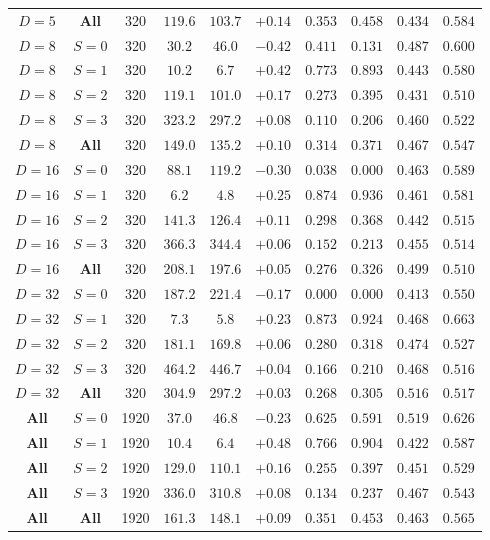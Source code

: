 \begin{table}[htbp]
\begin{tabular}{cc c ccc cc cc}
$D=5$ & \textbf{All} & 320 & $119.6$ & $103.7$ & $+0.14$ & $0.353$ & $0.458$ & $0.434$ & $0.584$ \\
$D=8$ & $S=0$ & 320 & $30.2$ & $46.0$ & $-0.42$ & $0.411$ & $0.131$ & $0.487$ & $0.600$ \\
$D=8$ & $S=1$ & 320 & $10.2$ & $6.7$ & $+0.42$ & $0.773$ & $0.893$ & $0.443$ & $0.580$ \\
$D=8$ & $S=2$ & 320 & $119.1$ & $101.0$ & $+0.17$ & $0.273$ & $0.395$ & $0.431$ & $0.510$ \\
$D=8$ & $S=3$ & 320 & $323.2$ & $297.2$ & $+0.08$ & $0.110$ & $0.206$ & $0.460$ & $0.522$ \\
$D=8$ & \textbf{All} & 320 & $149.0$ & $135.2$ & $+0.10$ & $0.314$ & $0.371$ & $0.467$ & $0.547$ \\
$D=16$ & $S=0$ & 320 & $88.1$ & $119.2$ & $-0.30$ & $0.038$ & $0.000$ & $0.463$ & $0.589$ \\
$D=16$ & $S=1$ & 320 & $6.2$ & $4.8$ & $+0.25$ & $0.874$ & $0.936$ & $0.461$ & $0.581$ \\
$D=16$ & $S=2$ & 320 & $141.3$ & $126.4$ & $+0.11$ & $0.298$ & $0.368$ & $0.442$ & $0.515$ \\
$D=16$ & $S=3$ & 320 & $366.3$ & $344.4$ & $+0.06$ & $0.152$ & $0.213$ & $0.455$ & $0.514$ \\
$D=16$ & \textbf{All} & 320 & $208.1$ & $197.6$ & $+0.05$ & $0.276$ & $0.326$ & $0.499$ & $0.510$ \\
$D=32$ & $S=0$ & 320 & $187.2$ & $221.4$ & $-0.17$ & $0.000$ & $0.000$ & $0.413$ & $0.550$ \\
$D=32$ & $S=1$ & 320 & $7.3$ & $5.8$ & $+0.23$ & $0.873$ & $0.924$ & $0.468$ & $0.663$ \\
$D=32$ & $S=2$ & 320 & $181.1$ & $169.8$ & $+0.06$ & $0.280$ & $0.318$ & $0.474$ & $0.527$ \\
$D=32$ & $S=3$ & 320 & $464.2$ & $446.7$ & $+0.04$ & $0.166$ & $0.210$ & $0.468$ & $0.516$ \\
$D=32$ & \textbf{All} & 320 & $304.9$ & $297.2$ & $+0.03$ & $0.268$ & $0.305$ & $0.516$ & $0.517$ \\
\textbf{All} & $S=0$ & 1920 & $37.0$ & $46.8$ & $-0.23$ & $0.625$ & $0.591$ & $0.519$ & $0.626$ \\
\textbf{All} & $S=1$ & 1920 & $10.4$ & $6.4$ & $+0.48$ & $0.766$ & $0.904$ & $0.422$ & $0.587$ \\
\textbf{All} & $S=2$ & 1920 & $129.0$ & $110.1$ & $+0.16$ & $0.255$ & $0.397$ & $0.451$ & $0.529$ \\
\textbf{All} & $S=3$ & 1920 & $336.0$ & $310.8$ & $+0.08$ & $0.134$ & $0.237$ & $0.467$ & $0.543$ \\
\textbf{All} & \textbf{All} & 1920 & $161.3$ & $148.1$ & $+0.09$ & $0.351$ & $0.453$ & $0.463$ & $0.565$ \\
\bottomrule
\end{tabular}
\end{table}